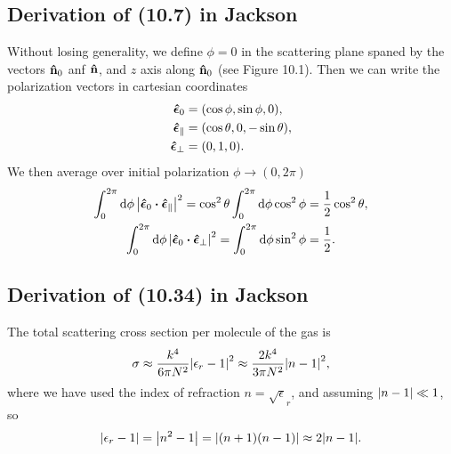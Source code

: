 \documentclass[10pt]{article}
\begin{document}
\subsection{Derivation of (10.7) in Jackson}
Without losing generality, we define $\phi = 0$ in the scattering plane spaned by the vectors $\vu{n}_0$ anf $\vu{n}$, and $z$ axis along $\vu{n}_0$ (see Figure 10.1). Then we can write the polarization vectors in cartesian coordinates
\begin{align*}
	\vu*{\epsilon}_0 &= (\cos{\phi}, \sin{\phi}, 0), \\
	\vu*{\epsilon}_{\parallel} &= (\cos{\theta}, 0, -\sin{\theta}), \\
	\vu*{\epsilon}_{\perp} &= (0, 1, 0).
\end{align*}
We then average over initial polarization $\phi \to (0, 2\pi)$
\begin{gather*}
	\int_0^{2\pi} \dd{\phi} \abs{\vu*{\epsilon}_0 \vdot \vu*{\epsilon}_{\parallel}}^2 = \cos^2{\theta} \int_0^{2\pi} \dd{\phi} \cos^2{\phi} = \frac{1}{2} \cos^2{\theta}, \\
	\int_0^{2\pi} \dd{\phi} \abs{\vu*{\epsilon}_0 \vdot \vu*{\epsilon}_{\perp}}^2 = \int_0^{2\pi} \dd{\phi} \sin^2{\phi} = \frac{1}{2}.
\end{gather*}

\subsection{Derivation of (10.34) in Jackson}

The total scattering cross section per molecule of the gas is
\begin{equation}
	\sigma \approx \frac{k^4}{6 \pi N^2} \abs{\epsilon_r - 1}^2 \approx \frac{2k^4}{3 \pi N^2} \abs{n - 1}^2,
\end{equation}
where we have used the index of refraction $n = \sqrt{\epsilon}_r$, and assuming $\abs{n-1} \ll 1$, so
\begin{equation}
	\abs{\epsilon_r - 1} = \abs{n^2 - 1} = \abs{(n+1)(n-1)} \approx 2\abs{n-1}.
\end{equation}
\end{document}
